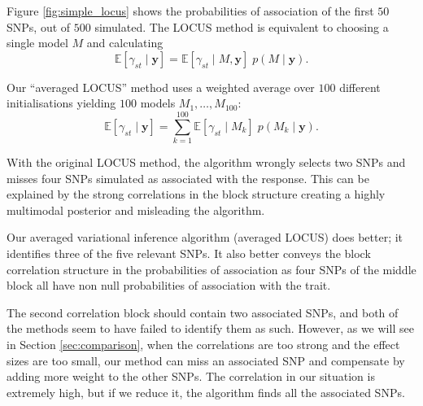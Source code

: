 \documentclass[a4paper, 11pt]{report}
\numberwithin{equation}{chapter}
\begin{document}
Figure \ref{fig:simple_locus} shows the probabilities of association of the first $50$ SNPs, out of $500$ simulated. The LOCUS method is equivalent to choosing a single model $M$ and calculating
\begin{equation*}
\mathbb{E}\left[\gamma_{st}\mid\boldsymbol{y}\right] = \mathbb{E}\left[\gamma_{st}\mid M,\boldsymbol{y}\right]\;p\left(M\mid\boldsymbol{y}\right).
\end{equation*}

Our ``averaged LOCUS'' method uses a weighted average over $100$ different initialisations yielding $100$ models $ M_1,\ldots,M_{100}$:
\begin{equation*}
\mathbb{E}\left[\gamma_{st}\mid\boldsymbol{y}\right] = \sum_{k=1}^{100}\mathbb{E}\left[\gamma_{st}\mid M_k\right]\;p\left(M_k\mid\boldsymbol{y}\right).
\end{equation*}

With the original LOCUS method, the algorithm wrongly selects two SNPs and misses four SNPs simulated as associated with the response. This can be explained by the strong correlations in the block structure creating a highly multimodal posterior and misleading the algorithm.

Our averaged variational inference algorithm (averaged LOCUS) does better; it identifies three of the five relevant SNPs. It also better conveys the block correlation structure in the probabilities of association as four SNPs of the middle block all have non null probabilities of association with the trait. 

The second correlation block should contain two associated SNPs, and both of the methods seem to have failed to identify them as such.
%
%
However, as we will see in Section \ref{sec:comparison}, when the correlations are too strong and the effect sizes are too small, our method can miss an associated SNP and compensate by adding more weight to the other SNPs. The correlation in our situation is extremely high, but if we reduce it, the algorithm finds all the associated SNPs.
\end{document}
